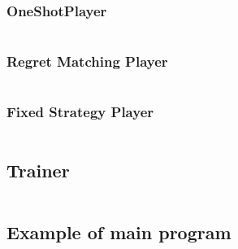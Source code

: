 \documentclass [11pt]{article}
\begin{document}
\subsubsection{OneShotPlayer}
\inputminted{python}{code/one_shot_player.py}
\subsubsection{Regret Matching Player}
\inputminted{python}{code/regret_minimization.py}
\subsubsection{Fixed Strategy Player}
\inputminted{python}{code/fixed.py}

\subsection{Trainer}
\inputminted{python}{code/one_shot_trainer.py}

\subsection{Example of main program}
\inputminted{python}{code/main.py}
\end{document}
